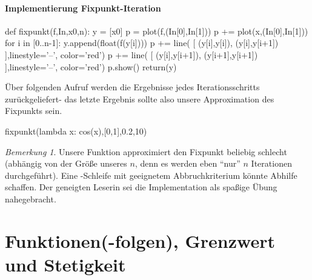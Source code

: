 \documentclass[fontsize=12pt,paper=a4,twoside,bibtotoc,idxtotoc,
liststotoc,pagesize,BCOR1.2cm,DIV15,chapterprefix,pagesize=pdftex]{scrbook}
\theoremstyle{plain}
\theoremstyle{definition}
\theoremstyle{remark}
\newtheorem{bem}[equation]{Bemerkung}
\begin{document}
\subsubsection{Implementierung Fixpunkt-Iteration}
\begin{sagein}
def fixpunkt(f,In,x0,n):
    y = [x0]
    p = plot(f,(In[0],In[1]))
    p += plot(x,(In[0],In[1]))
    for i in [0..n-1]:
        y.append(float(f(y[i])))
        p += line( [ (y[i],y[i]), (y[i],y[i+1]) ],linestyle='--', color='red')
        p += line( [ (y[i],y[i+1]), (y[i+1],y[i+1]) ],linestyle='--', color='red')
    p.show()
    return(y)
\end{sagein}
Über folgenden Aufruf werden die Ergebnisse jedes Iterationsschritts zurückgeliefert- das letzte Ergebnis sollte also unsere Approximation des Fixpunkts sein.
\begin{sagein}
fixpunkt(lambda x: cos(x),[0,1],0.2,10)
\end{sagein}
\begin{sage}
[0.200000000000000, 0.98006657784124163, 0.55696725280964243, 0.84886216565827077, 0.66083755111661502, 0.78947843776686832, 0.70421571334199318, 0.76211956176066087, 0.72337417210557109, 0.74957657633149311, 0.73197742525819132]
\end{sage}
\begin{bem}
 Unsere Funktion approximiert den Fixpunkt beliebig schlecht (abhängig von der Größe unseres $n$, denn es werden eben ``nur'' $n$ Iterationen durchgeführt). Eine -Schleife 
mit geeignetem Abbruchkriterium könnte Abhilfe schaffen. Der geneigten Leserin sei die Implementation als spaßige Übung nahegebracht.
\end{bem}


\chapter{Funktionen(-folgen), Grenzwert und Stetigkeit}
\end{document}
